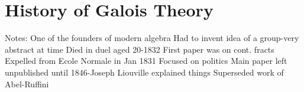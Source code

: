 \documentclass[12pt]{article}
\begin{document}
\section{History of Galois Theory}

Notes:
One of the founders of modern algebra
Had to invent idea of a group-very abstract at time
Died in duel aged 20-1832
First paper was on cont. fracts
Expelled from Ecole Normale in Jan 1831
Focused on politics
Main paper left unpublished until 1846-Joseph Liouville explained things
Superseded work of Abel-Ruffini

\newpage

\end{document}
